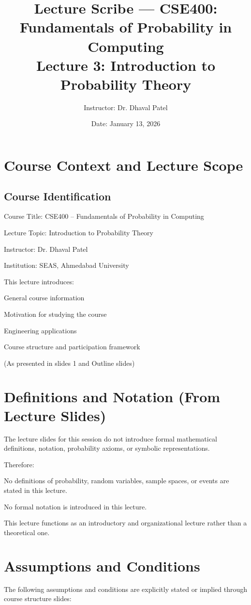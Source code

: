 \documentclass[12pt]{article}
\title{Lecture Scribe — CSE400: Fundamentals of Probability in Computing\\
Lecture 3: Introduction to Probability Theory}
\author{Instructor: Dr. Dhaval Patel}
\date{Date: January 13, 2026}
\begin{document}
\maketitle

\section{Course Context and Lecture Scope}

\subsection{Course Identification}

Course Title: CSE400 – Fundamentals of Probability in Computing

Lecture Topic: Introduction to Probability Theory

Instructor: Dr. Dhaval Patel

Institution: SEAS, Ahmedabad University

This lecture introduces:

General course information

Motivation for studying the course

Engineering applications

Course structure and participation framework

(As presented in slides 1 and Outline slides) 


\section{Definitions and Notation (From Lecture Slides)}

The lecture slides for this session do not introduce formal mathematical definitions, notation, probability axioms, or symbolic representations.

Therefore:

No definitions of probability, random variables, sample spaces, or events are stated in this lecture.

No formal notation is introduced in this lecture.

This lecture functions as an introductory and organizational lecture rather than a theoretical one.

\section{Assumptions and Conditions}

The following assumptions and conditions are explicitly stated or implied through course structure slides:
\end{document}
